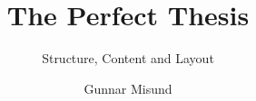 \documentclass[
]{thesistemplate}
\affiliation{Høgskolen i Østfold}
\title{The Perfect Thesis} %
\subtitle{Structure, Content and Layout}
\author{Gunnar Misund}
\begin{document}
\maketitle          %
\makehalftitle      %
\frontmatter        %





\tableofcontents    %

\listoffigures      %
\listoftables       %
\lstlistoflistings  %

\mainmatter  %










\printglossaries            %

\end{document}
